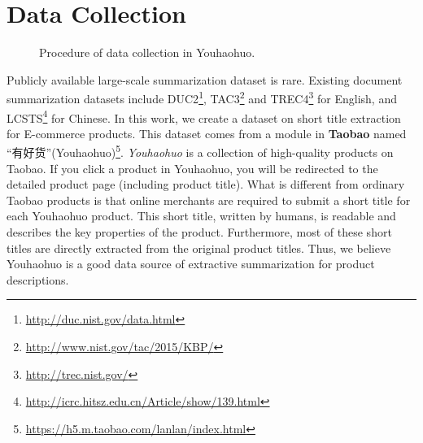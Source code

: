\section{Data Collection}
\label{sec:data}

\begin{figure*}[h]
	\centering
	\caption{Procedure of data collection in Youhaohuo.}
	\label{fig:youhaohuo_demo}
	\vspace{-10pt}
\end{figure*}

Publicly available large-scale summarization dataset is rare.
Existing document summarization datasets include
DUC2\footnote{\url{http://duc.nist.gov/data.html}}, 
TAC3\footnote{\url{http://www.nist.gov/tac/2015/KBP/}} and 
TREC4\footnote{\url{http://trec.nist.gov/}} for English,
and LCSTS\footnote{\url{http://icrc.hitsz.edu.cn/Article/show/139.html}} for
Chinese.
In this work, we create a dataset on short title extraction for 
E-commerce products. 
This dataset comes from a module in \textbf{Taobao} named ``有好货''(Youhaohuo)\footnote{\url{https://h5.m.taobao.com/lanlan/index.html}}.
{\em Youhaohuo} is a collection of high-quality 
products on Taobao.  If you click a product in Youhaohuo, you will 
be redirected to the detailed product page (including product title).
What is different from ordinary Taobao products is that online merchants are 
required to submit a short title for each Youhaohuo product.
This short title, written by humans, is readable and describes the 
key properties of the product.
Furthermore, most of these short titles are directly extracted from the 
original product titles. 
Thus, we believe Youhaohuo is a good data source of 
extractive summarization for product descriptions.



